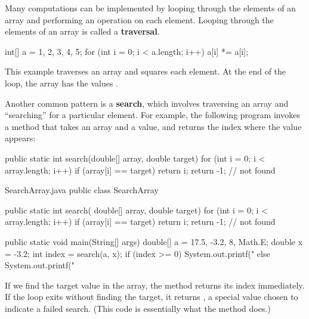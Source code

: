 
Many computations can be implemented by looping through the elements of an array and performing an operation on each element.
Looping through the elements of an array is called a {\bf traversal}.

\begin{code}
int[] a = {1, 2, 3, 4, 5};
for (int i = 0; i < a.length; i++) {
    a[i] *= a[i];
}
\end{code}

This example traverses an array and squares each element.
At the end of the loop, the array has the values .



Another common pattern is a {\bf search}, which involves traversing an array and ``searching'' for a particular element.
For example, the following program invokes a method that takes an array and a value, and returns the index where the value appears:

\begin{code}
public static int search(double[] array, double target) {
    for (int i = 0; i < array.length; i++) {
        if (array[i] == target) {
            return i;
        }
    }
    return -1;  // not found
}
\end{code}
\begin{trinket} [370] {SearchArray.java}
public class SearchArray {

    public static int search( double[] array, double target) {
       for (int i = 0; i < array.length; i++) {
           if (array[i] == target) {
               return i;
           }
       }
       return -1;  // not found
    }    
    
    public static void main(String[] args) {
       double[] a = {17.5, -3.2, 8, Math.E};
       double x = -3.2;
       int index = search(a, x);
       if (index >= 0) {
          System.out.printf("%
       } else {
          System.out.printf("%
       }             
    }
}
\end{trinket}

If we find the target value in the array, the  method returns its index immediately.
If the loop exits without finding the target, it returns , a special value chosen to indicate a failed search.
(This code is essentially what the  method does.)

